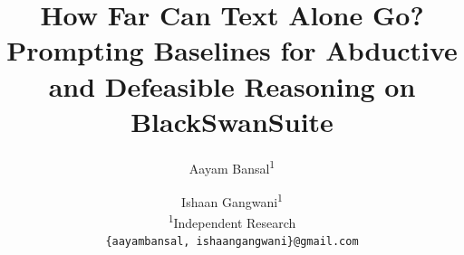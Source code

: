 \documentclass[10pt,twocolumn,letterpaper]{article}
\title{How Far Can Text Alone Go? Prompting Baselines for Abductive and Defeasible Reasoning on BlackSwanSuite}
\author{Aayam Bansal\textsuperscript{1} \and Ishaan Gangwani\textsuperscript{1}\\
\textsuperscript{1}Independent Research\\
{\tt\small \{aayambansal, ishaangangwani\}@gmail.com}}
\begin{document}
\maketitle








{
    \small
    
    
}
\end{document}

